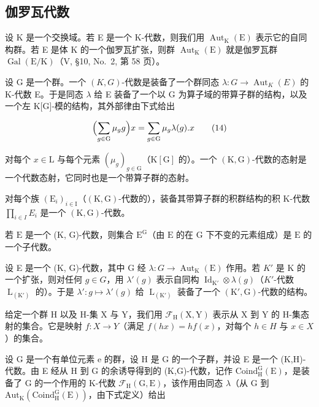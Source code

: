 \subsection{伽罗瓦代数}

设 K 是一个交换域。若 E 是一个 K-代数，则我们用 \(\operatorname{Aut}_{\mathrm{K}}(\mathrm{E})\) 表示它的自同构群。若 E 是体 K 的一个伽罗瓦扩张，则群 \(\operatorname{Aut}_{\mathrm{K}}(\mathrm{E})\) 就是伽罗瓦群 \(\operatorname{Gal}(\mathrm{E}/\mathrm{K})\)（V, §10, No.~2, 第 58 页）。

设 G 是一个群。一个 \((K,G)\)-代数是装备了一个群同态 \(\lambda:G\to\operatorname{Aut}_{K}(E)\) 的 K-代数 E。于是同态 \(\lambda\) 给 E 装备了一个以 G 为算子域的带算子群的结构，以及一个左 K{[}G{]}-模的结构，其外部律由下式给出

\[
\Bigl (\sum_ {g \in \mathrm{G}} \mu_ {g} g \Bigr) x = \sum_ {g \in \mathrm{G}} \mu_ {g} \lambda (g). x\tag{14}
\]

对每个 \(x \in \mathrm{L}\) 与每个元素 \((\mu_g)_{g \in \mathrm{G}}\)（\(\mathrm{K}[\mathrm{G}]\) 的）。一个 \((\mathrm{K}, \mathrm{G})\)-代数的态射是一个代数态射，它同时也是一个带算子群的态射。

对每个族 \((\mathrm{E}_{i})_{i\in\mathrm{I}}\)（\((\mathrm{K},\mathrm{G})\)-代数的），装备其带算子群的积群结构的积 K-代数 \(\prod_{i\in I}E_{i}\) 是一个 \((\mathrm{K},\mathrm{G})\)-代数。

若 \(\mathrm{E}\) 是一个 (K, G)-代数，则集合 \(\mathrm{E}^{\mathrm{G}}\)（由 \(\mathrm{E}\) 的在 \(\mathrm{G}\) 下不变的元素组成）是 \(\mathrm{E}\) 的一个子代数。

设 E 是一个 (K, G)-代数，其中 G 经 \(\lambda: G \to \operatorname{Aut}_{\mathrm{K}}(\mathrm{E})\) 作用。若 \(K'\) 是 K 的一个扩张，则对任何 \(g \in G\)，用 \(\lambda'(g)\) 表示自同构 \(\operatorname{Id}_{\mathrm{K}'} \otimes \lambda(g)\)（\(K'\)-代数 \(\operatorname{L}_{(\mathrm{K}')}\) 的）。于是 \(\lambda': g \mapsto \lambda'(g)\) 给 \(\operatorname{L}_{(\mathrm{K}')}\) 装备了一个 \((\mathrm{K}', \mathrm{G})\)-代数的结构。

给定一个群 H 以及 H-集 X 与 Y，我们用 \(\mathcal{F}_{\mathrm{H}}(\mathrm{X},\mathrm{Y})\) 表示从 X 到 Y 的 H-集态射的集合。它是映射 \(f:X\to Y\)（满足 \(f(hx)=hf(x)\)，对每个 \(h\in H\) 与 \(x\in X\)）的集合。

设 G 是一个有单位元素 e 的群，设 H 是 G 的一个子群，并设 E 是一个 (K,H)-代数。由 E 经从 H 到 G 的余诱导得到的 (K,G)-代数，记作 \(\mathrm{Coind}_{\mathrm{H}}^{\mathrm{G}}(\mathrm{E})\)，是装备了 G 的一个作用的 K-代数 \(\mathcal{F}_{\mathrm{H}}(\mathrm{G},\mathrm{E})\)，该作用由同态 \(\lambda\)（从 G 到 \(\mathrm{Aut}_{\mathrm{K}}(\mathrm{Coind}_{\mathrm{H}}^{\mathrm{G}}(\mathrm{E}))\)，由下式定义）给出

